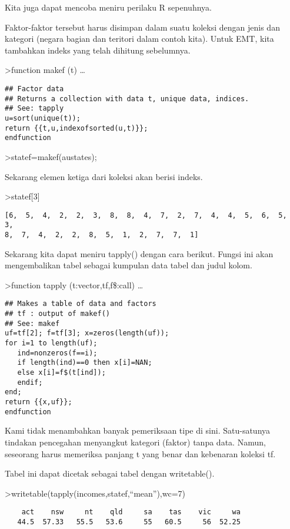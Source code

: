 \documentclass[
]{book}
\begin{document}
Kita juga dapat mencoba meniru perilaku R sepenuhnya.

Faktor-faktor tersebut harus disimpan dalam suatu koleksi dengan jenis dan kategori (negara bagian dan teritori dalam contoh kita). Untuk EMT, kita tambahkan indeks yang telah dihitung sebelumnya.

\textgreater function makef (t) \ldots{}

\begin{verbatim}
## Factor data
## Returns a collection with data t, unique data, indices.
## See: tapply
u=sort(unique(t));
return {{t,u,indexofsorted(u,t)}};
endfunction
\end{verbatim}

\textgreater statef=makef(austates);

Sekarang elemen ketiga dari koleksi akan berisi indeks.

\textgreater statef{[}3{]}

\begin{verbatim}
[6,  5,  4,  2,  2,  3,  8,  8,  4,  7,  2,  7,  4,  4,  5,  6,  5,  3,
8,  7,  4,  2,  2,  8,  5,  1,  2,  7,  7,  1]
\end{verbatim}

Sekarang kita dapat meniru tapply() dengan cara berikut. Fungsi ini akan mengembalikan tabel sebagai kumpulan data tabel dan judul kolom.

\textgreater function tapply (t:vector,tf,f\$:call) \ldots{}

\begin{verbatim}
## Makes a table of data and factors
## tf : output of makef()
## See: makef
uf=tf[2]; f=tf[3]; x=zeros(length(uf));
for i=1 to length(uf);
   ind=nonzeros(f==i);
   if length(ind)==0 then x[i]=NAN;
   else x[i]=f$(t[ind]);
   endif;
end;
return {{x,uf}};
endfunction
\end{verbatim}

Kami tidak menambahkan banyak pemeriksaan tipe di sini. Satu-satunya tindakan pencegahan menyangkut kategori (faktor) tanpa data. Namun, seseorang harus memeriksa panjang t yang benar dan kebenaran koleksi tf.

Tabel ini dapat dicetak sebagai tabel dengan writetable().

\textgreater writetable(tapply(incomes,statef,``mean''),wc=7)

\begin{verbatim}
    act    nsw     nt    qld     sa    tas    vic     wa
   44.5  57.33   55.5   53.6     55   60.5     56  52.25
\end{verbatim}
\end{document}
